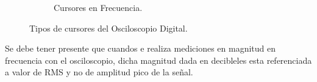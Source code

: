 \begin{figure}[H]
\begin{subfigure}[H]{0.45\textwidth}
                \caption{Cursores en Frecuencia.}
                \label{fig:CursorFrec}
                \end{subfigure}
                \caption{Tipos de cursores del Osciloscopio Digital.}
                \label{fig:CursorTipos}
            \end{figure}

        Se debe tener presente que cuandos e realiza mediciones en magnitud en frecuencia con 
        el osciloscopio, dicha magnitud dada en decibleles esta referenciada a valor de RMS
        y no de amplitud pico de la señal.
                
    

    



